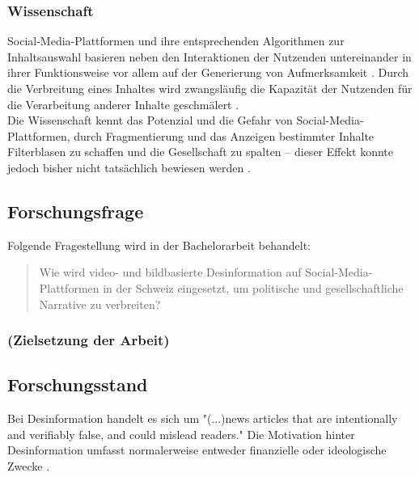 \documentclass[12pt,a4paper]{article}        %
\begin{document}
\subsubsection{Wissenschaft}
Social-Media-Plattformen und ihre entsprechenden Algorithmen zur Inhaltsauswahl basieren neben den Interaktionen der Nutzenden untereinander in ihrer Funktionsweise vor allem auf der Generierung von Aufmerksamkeit \parencites[vgl.][220]{schmidt_meinungsbildung_2022}[493]{behnke_manipulation_2018}. Durch die Verbreitung eines Inhaltes wird zwangsläufig die Kapazität der Nutzenden für die Verarbeitung anderer Inhalte geschmälert \parencite[248]{hohlfeld_schlechte_2020}. \\
Die Wissenschaft kennt das Potenzial und die Gefahr von Social-Media-Plattformen, durch Fragmentierung und das Anzeigen bestimmter Inhalte Filterblasen zu schaffen und die Gesellschaft zu spalten – dieser Effekt konnte jedoch bisher nicht tatsächlich bewiesen werden \parencite[220]{schmidt_meinungsbildung_2022}.\\

\subsection{Forschungsfrage}
Folgende Fragestellung wird in der Bachelorarbeit behandelt:\\

\begin{quote}
  Wie wird video- und bildbasierte Desinformation auf Social-Media-Plattformen in der Schweiz eingesetzt, um politische und gesellschaftliche Narrative zu verbreiten?
\end{quote}

\subsubsection{(Zielsetzung der Arbeit)}

\subsection{Forschungsstand}

Bei Desinformation handelt es sich um "(...)news articles that are intentionally and verifiably false, and could mislead readers." \parencite[213]{allcott_social_2017} Die Motivation hinter Desinformation umfasst normalerweise entweder finanzielle oder ideologische Zwecke \parencites[vgl.][138]{tandoc_defining_2018}[225]{schmidt_meinungsbildung_2022}[154-155]{lange_unsicherheit_2019}.
\end{document}
